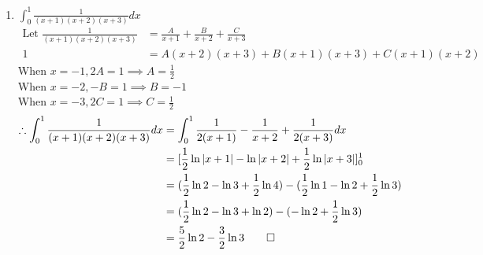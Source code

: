 \documentclass[12pt, a4paper]{article}
\begin{document}
\begin{enumerate}[Q\arabic*.]
\begin{enumerate}[(\alph*)]
      \item $\displaystyle \int^1_0 \frac{1}{(x+1)(x+2)(x+3)} dx$
        \begin{align*}
          \text{Let }\frac{1}{(x+1)(x+2)(x+3)} &= \frac{A}{x+1} + \frac{B}{x+2} + \frac{C}{x+3}\\
          1 &= A(x+2)(x+3) + B(x+1)(x+3) + C(x+1)(x+2)
        \end{align*}
        When $x = -1, 2A = 1 \implies A = \frac{1}{2}$\\
        When $x = -2, -B = 1 \implies B = -1$\\
        When $x = -3, 2C = 1 \implies C = \frac{1}{2}$\\
        \begin{align*}
          \therefore \int^1_0 \frac{1}{(x+1)(x+2)(x+3)} dx &= \int^1_0 \frac{1}{2(x+1)} -\frac{1}{x+2} + \frac{1}{2(x+3)} dx\\
                                                &= [\frac{1}{2}\ln|x+1| - \ln|x+2| + \frac{1}{2}\ln|x+3|]^1_0\\
                                                &= (\frac{1}{2}\ln2 -\ln3 + \frac{1}{2}\ln4) - (\frac{1}{2}\ln1 - \ln2 + \frac{1}{2}\ln3)\\
                                                &= (\frac{1}{2}\ln2 -\ln3 + \ln2) - (- \ln2 + \frac{1}{2}\ln3)\\
                                                &= \frac{5}{2}\ln2 - \frac{3}{2}\ln 3 \qed\\
        \end{align*}


\end{enumerate}
\end{enumerate}
\end{document}
